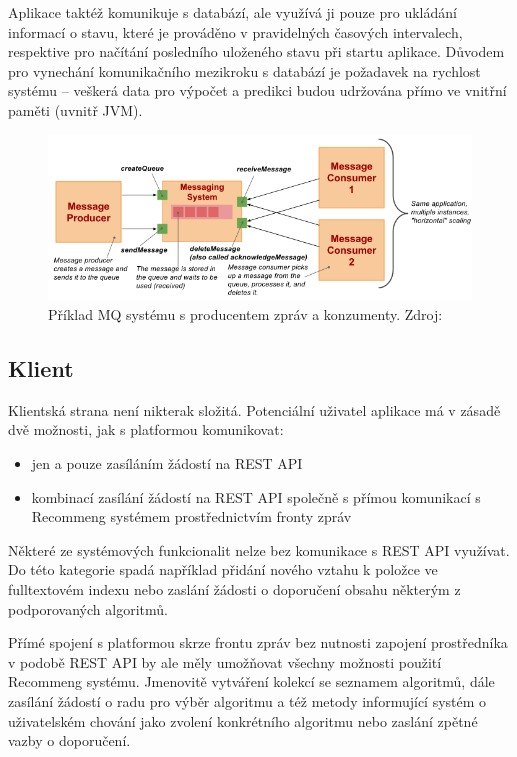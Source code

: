 \documentclass[thesis=M,czech]{FITthesis}[2014/05/07]
\begin{document}
Aplikace taktéž komunikuje s databází, ale využívá ji pouze pro ukládání informací o stavu, které je prováděno v pravidelných časových intervalech, respektive pro načítání posledního uloženého stavu při startu aplikace. Důvodem pro vynechání komunikačního mezikroku s databází je požadavek na rychlost systému – veškerá data pro výpočet a predikci budou udržována přímo ve vnitřní paměti (uvnitř JVM). 

\begin{figure}\centering
	\includegraphics[width=1.2\textwidth]{obr/vitvar_mq.png}
 	\caption[Příklad MQ systému s producentem zpráv a konzumenty]{Příklad MQ systému s producentem zpráv a konzumenty. Zdroj: \cite{vitvarMq}}\label{fig:vitvarMq}
\end{figure}	

\subsection{Klient}

Klientská strana není nikterak složitá. Potenciální uživatel aplikace má v zásadě dvě možnosti, jak s platformou komunikovat:

\begin{itemize}
	\item jen a pouze zasíláním žádostí na REST API
	\item kombinací zasílání žádostí na REST API společně s přímou komunikací s Recommeng systémem prostřednictvím fronty zpráv
\end{itemize}

Některé ze systémových funkcionalit nelze bez komunikace s REST API využívat. Do této kategorie spadá například přidání nového vztahu k položce ve fulltextovém indexu nebo zaslání žádosti o doporučení obsahu některým z podporovaných algoritmů. 

Přímé spojení s platformou skrze frontu zpráv bez nutnosti zapojení prostředníka v podobě REST API by ale měly umožňovat všechny možnosti použití Recommeng systému. Jmenovitě vytváření kolekcí se seznamem algoritmů, dále zasílání žádostí o radu pro výběr algoritmu a též metody informující systém o uživatelském chování jako zvolení konkrétního algoritmu nebo zaslání zpětné vazby o doporučení. 
\end{document}
